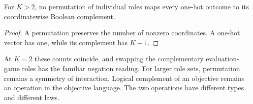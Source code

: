 \begin{proposition}
For $K>2$, no permutation of individual roles maps every one-hot outcome to
its coordinatewise Boolean complement.
\end{proposition}
\begin{proof}
A permutation preserves the number of nonzero coordinates. A one-hot vector
has one, while its complement has $K-1$.
\end{proof}

At $K=2$ these counts coincide, and swapping the complementary evaluation-game
roles has the familiar negation reading. For larger role sets, permutation
remains a symmetry of interaction. Logical complement of an objective remains
an operation in the objective language. The two operations have different
types and different laws.
